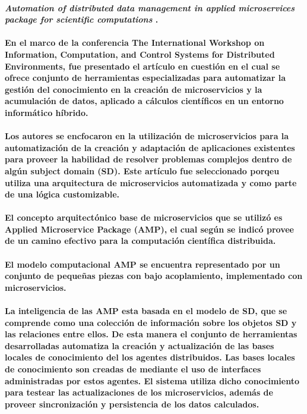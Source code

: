 \paragraph{
    \textbf{\emph{Automation of distributed data management in applied
            microservices package for scientific computations
        }
    }
    \cite{oparin_automation_2020}.
}

\paragraph{
    En el marco de la conferencia
    \textbf{The International Workshop on Information, Computation, and Control Systems for Distributed Environments},
    fue presentado el artículo en cuestión en el cual se ofrece conjunto de herramientas especializadas para automatizar la gestión del conocimiento en
    la creación de microservicios y la acumulación de datos, aplicado a
    cálculos científicos en un entorno informático híbrido.
}

\paragraph{
    Los autores se encfocaron en la utilización de microservicios para la automatización de la creación y adaptación de aplicaciones existentes para proveer la habilidad de resolver problemas complejos dentro de algún subject domain (SD).
    Este artículo fue seleccionado porqeu utiliza una arquitectura de microservicios automatizada y como parte de una
    lógica customizable.
}

\paragraph{
    El concepto arquitectónico base de microservicios que se utilizó es Applied Microservice Package (AMP),
    el cual según se indicó provee de un camino efectivo para la computación científica distribuida.
}

\paragraph{
    El modelo computacional AMP se encuentra representado por un conjunto de pequeñas piezas con bajo acoplamiento,
    implementado con microservicios.
}

\paragraph{
    La inteligencia de las AMP esta basada en el modelo de SD,
    que se comprende como una colección de información sobre los objetos SD y las relaciones entre ellos.
    De esta manera el conjunto de herramientas desarrolladas automatiza la creación y actualización
    de las bases locales de conocimiento del los agentes distribuidos. Las bases locales de conocimiento
    son creadas de mediante el uso de interfaces administradas por estos agentes.
    El sistema utiliza dicho conocimiento para testear las actualizaciones de los microservicios,
    además de proveer sincronización y persistencia de los datos calculados.
}

